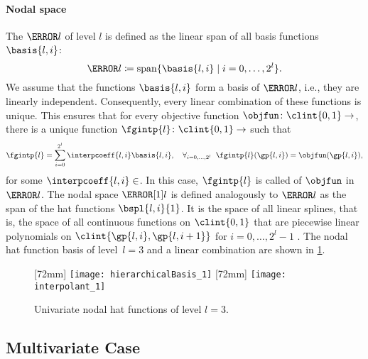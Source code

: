 \paragraph{Nodal space}

The  $\ns{l}$ of level $l$
is defined as the linear span of all basis functions
$\basis{l,i}$:
\begin{equation}
  \ns{l} \ceq \spn\{\basis{l,i} \mid i = 0, \dotsc, 2^l\}.
\end{equation}
We assume that the functions $\basis{l,i}$ form a basis of $\ns{l}$, i.e.,
they are linearly independent.
Consequently, every linear combination of these functions is unique.
This ensures that for every objective function $\objfun\colon \clint{0, 1} \to \real$,
there is a unique function $\fgintp{l}\colon \clint{0, 1} \to \real$ such that
\begin{equation}
  \label{eq:interpFullGridUV}
  \fgintp{l}
  = \sum_{i=0}^{2^l} \interpcoeff{l,i} \basis{l,i},\quad
  \falarge{i = 0, \dotsc, 2^l}{\fgintp{l}(\gp{l,i}) = \objfun(\gp{l,i})},
\end{equation}
for some $\interpcoeff{l,i} \in \real$.
In this case, $\fgintp{l}$ is called  of $\objfun$ in $\ns{l}$.
The nodal space $\nsbspl{l}{1}$ is defined analogously to $\ns{l}$
as the span of the hat functions $\bspl{l,i}{1}$.
It is the space of all linear splines,
that is, the space of all continuous functions on $\clint{0, 1}$ that are
piecewise linear polynomials on $\clint{\gp{l,i}, \gp{l,i+1}}$ for
$i = 0, \dotsc, 2^l - 1$ \cite{Hoellig13Approximation}.
The nodal hat function basis of level~$l = 3$
and a linear combination are shown in \cref{fig:nodalHat}.

\begin{figure}
  [72mm]{%
    \texttt{[image: hierarchicalBasis\_1]}%
  }%
  \hfill%
  [72mm]{%
    \texttt{[image: interpolant\_1]}%
  }%
  \caption[%
    Univariate nodal hat functions%
  ]{%
    Univariate nodal hat functions of level $l = 3$.%
  }%
  \label{fig:nodalHat}%
\end{figure}



\subsection{Multivariate Case}
\label{sec:212nodalMV}

